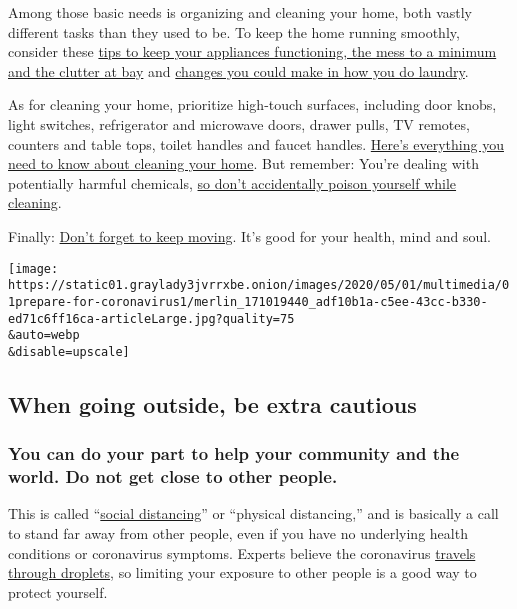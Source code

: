 Among those basic needs is organizing and cleaning your home, both
vastly different tasks than they used to be. To keep the home running
smoothly, consider these
\href{https://www.nytimes3xbfgragh.onion/2020/04/02/smarter-living/protect-your-home-against-the-onslaught.html}{tips
to keep your appliances functioning, the mess to a minimum and the
clutter at bay} and
\href{https://www.nytimes3xbfgragh.onion/2020/03/26/style/how-to-do-laundry-coronavirus.html}{changes
you could make in how you do laundry}.

As for cleaning your home, prioritize high-touch surfaces, including
door knobs, light switches, refrigerator and microwave doors, drawer
pulls, TV remotes, counters and table tops, toilet handles and faucet
handles.
\href{https://www.nytimes3xbfgragh.onion/2020/03/18/world/clean-home-coronavirus.html}{Here's
everything you need to know about cleaning your home}. But remember:
You're dealing with potentially harmful chemicals,
\href{https://www.nytimes3xbfgragh.onion/2020/04/02/smarter-living/coronavirus-clean-home-house-disinfect.html}{so
don't accidentally poison yourself while cleaning}.

Finally:
\href{https://www.nytimes3xbfgragh.onion/2020/04/01/well/move/steps-walking-longevity-health.html}{Don't
forget to keep moving}. It's good for your health, mind and soul.

\texttt{[image: https://static01.graylady3jvrrxbe.onion/images/2020/05/01/multimedia/01prepare-for-coronavirus1/merlin\_171019440\_adf10b1a-c5ee-43cc-b330-ed71c6ff16ca-articleLarge.jpg?quality=75\\\&auto=webp\\\&disable=upscale]}

\hypertarget{when-going-outside-be-extra-cautious}{%
\subsection{When going outside, be extra
cautious}\label{when-going-outside-be-extra-cautious}}

\hypertarget{you-can-do-your-part-to-help-your-community-and-the-world-do-not-get-close-to-other-people}{%
\subsubsection{You can do your part to help your community and the
world. Do not get close to other
people.}\label{you-can-do-your-part-to-help-your-community-and-the-world-do-not-get-close-to-other-people}}

This is called
``\href{https://www.nytimes3xbfgragh.onion/2020/03/16/smarter-living/coronavirus-social-distancing.html}{social
distancing}'' or ``physical distancing,'' and is basically a call to
stand far away from other people, even if you have no underlying health
conditions or coronavirus symptoms. Experts believe the coronavirus
\href{https://www.nytimes3xbfgragh.onion/2020/03/02/health/coronavirus-how-it-spreads.html}{travels
through droplets}, so limiting your exposure to other people is a good
way to protect yourself.

